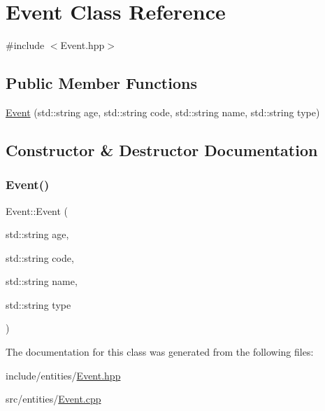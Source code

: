 \hypertarget{class_event}{}\section{Event Class Reference}
\label{class_event}


{\ttfamily \#include $<$Event.\+hpp$>$}

\subsection*{Public Member Functions}
\begin{DoxyCompactItemize}
\item 
\mbox{\hyperlink{class_event_a73aebcc4b136bead178dc61c28d334f2}{Event}} (std\+::string age, std\+::string code, std\+::string name, std\+::string type)
\end{DoxyCompactItemize}


\subsection{Constructor \& Destructor Documentation}
\mbox{\label{class_event_a73aebcc4b136bead178dc61c28d334f2}} 
\subsubsection{\texorpdfstring{Event()}{Event()}}
{\footnotesize\ttfamily Event\+::\+Event (\begin{DoxyParamCaption}\item[{std\+::string}]{age,  }\item[{std\+::string}]{code,  }\item[{std\+::string}]{name,  }\item[{std\+::string}]{type }\end{DoxyParamCaption})}



The documentation for this class was generated from the following files\+:\begin{DoxyCompactItemize}
\item 
include/entities/\mbox{\hyperlink{_event_8hpp}{Event.\+hpp}}\item 
src/entities/\mbox{\hyperlink{_event_8cpp}{Event.\+cpp}}\end{DoxyCompactItemize}
